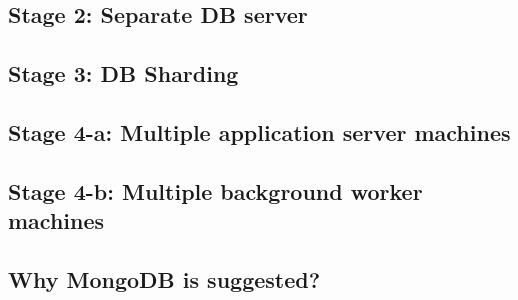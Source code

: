 \documentclass[12pt]{article}
\begin{document}
\subsection{Stage 2: Separate DB server}
\subsection{Stage 3: DB Sharding}
\subsection{Stage 4-a: Multiple application server machines}
\subsection{Stage 4-b: Multiple background worker machines}
\subsection{Why MongoDB is suggested?}
\end{document}
